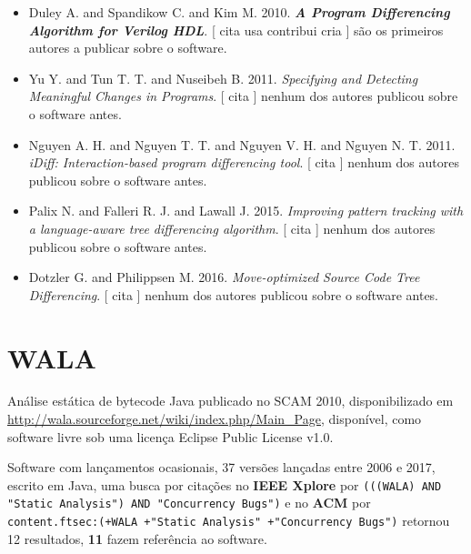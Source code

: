 \begin{itemize}
\item Duley A. and Spandikow C. and Kim M.
      2010.
        \textbf{\textit{ A Program Differencing Algorithm for Verilog HDL}}.
      [
          cita
          usa
          contribui
          cria
      ]
são os primeiros autores a publicar sobre o software.
\item Yu Y. and Tun T. T. and Nuseibeh B.
      2011.
        \textit{ Specifying and Detecting Meaningful Changes in Programs}.
      [
          cita
      ]
nenhum dos autores publicou sobre o software antes.
\item Nguyen A. H. and Nguyen T. T. and Nguyen V. H. and Nguyen N. T.
      2011.
        \textit{ iDiff: Interaction-based program differencing tool}.
      [
          cita
      ]
nenhum dos autores publicou sobre o software antes.
\item Palix N. and Falleri R. J. and Lawall J.
      2015.
        \textit{ Improving pattern tracking with a language-aware tree differencing algorithm}.
      [
          cita
      ]
nenhum dos autores publicou sobre o software antes.
\item Dotzler G. and Philippsen M.
      2016.
        \textit{ Move-optimized Source Code Tree Differencing}.
      [
          cita
      ]
nenhum dos autores publicou sobre o software antes.
\end{itemize}
\section{WALA}

Análise estática de bytecode Java
publicado no SCAM 2010,
disponibilizado em \url{http://wala.sourceforge.net/wiki/index.php/Main_Page},
disponível,
como software livre
sob uma licença Eclipse Public License v1.0.

Software com lançamentos ocasionais,
37 versões lançadas
entre 2006 e 2017,
escrito em Java,
uma busca por citações no {\bf IEEE Xplore} por
\texttt{(((WALA) AND "Static Analysis") AND "Concurrency Bugs")}
e no {\bf ACM} por
\texttt{content.ftsec:(+WALA +"Static Analysis" +"Concurrency Bugs")}
retornou
12 resultados,
{\bf 11} fazem referência ao software.


